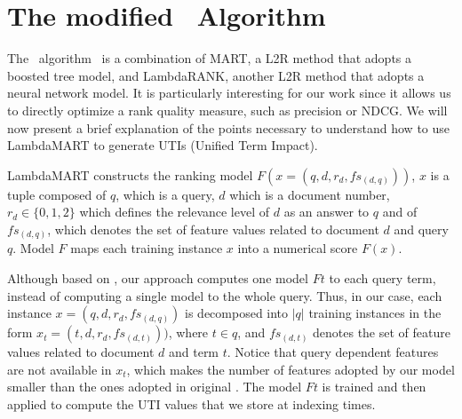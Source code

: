\documentclass[preprint,review,10pt,3p]{elsarticle}
\begin{document}
\section{The modified \lambdamart\ Algorithm}
\label{lambda}
\newcommand{\lamdamart}{LambdaMART}

The \lambdamart\ algorithm~\cite{wu2010lambdamart} is a combination of
MART, a L2R method that adopts a boosted tree model, and LambdaRANK,
another L2R method that adopts a neural network model. It is
particularly interesting for our work since it allows us to directly
optimize a rank quality measure, such as precision or NDCG. We will
now present a brief explanation of the points necessary to understand
how to use LambdaMART to generate UTIs (Unified Term Impact).

LambdaMART constructs the ranking model $F(x=(q,d,r_d,fs_{(d,q)}))$,
$x$ is a tuple composed of $q$, which is a query, $d$ which is a
document number, $r_d \in \{0,1,2\}$ which defines the relevance level of
$d$ as an answer to $q$ and of $fs_{(d,q)}$, which denotes the set of
feature values related to document $d$ and query $q$. Model $F$ maps
each training instance $x$ into a numerical score $F(x)$.

Although based on \lambdamart, our approach computes one model $Ft$
to each query term, instead of computing a single model to the whole
query. Thus, in our case, each instance $x=(q,d,r_d,fs_{(d,q)})$ is
decomposed into $|q|$ training instances in the form $x_t=
(t,d,r_d,fs_{(d,t)}))$, where $t \in q$, and $fs_{(d,t)}$ denotes the
set of feature values related to document $d$ and term $t$. Notice
that query dependent features are not available in $x_t$, which makes
the number of features adopted by our model smaller than the ones
adopted in original \lambdamart. The model $Ft$ is trained and then
applied to compute the UTI values that we store at indexing times.
\end{document}

